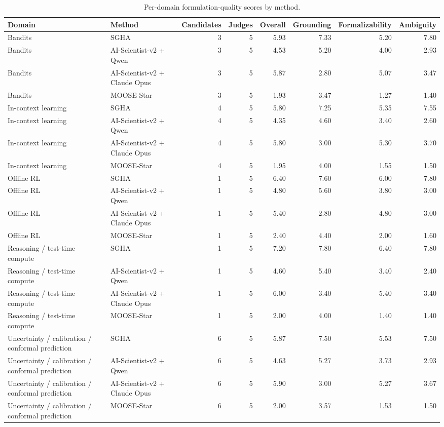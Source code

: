 \begin{table}[htbp]
\centering
\caption{Per-domain formulation-quality scores by method.}
\label{tab:per\_domain\_scores}
\begin{tabular}{llrrrrrr}
\toprule
Domain & Method & Candidates & Judges & Overall & Grounding & Formalizability & Ambiguity \\
\midrule
Bandits & SGHA & 3 & 5 & 5.93 & 7.33 & 5.20 & 7.80 \\
Bandits & AI-Scientist-v2 + Qwen & 3 & 5 & 4.53 & 5.20 & 4.00 & 2.93 \\
Bandits & AI-Scientist-v2 + Claude Opus & 3 & 5 & 5.87 & 2.80 & 5.07 & 3.47 \\
Bandits & MOOSE-Star & 3 & 5 & 1.93 & 3.47 & 1.27 & 1.40 \\
In-context learning & SGHA & 4 & 5 & 5.80 & 7.25 & 5.35 & 7.55 \\
In-context learning & AI-Scientist-v2 + Qwen & 4 & 5 & 4.35 & 4.60 & 3.40 & 2.60 \\
In-context learning & AI-Scientist-v2 + Claude Opus & 4 & 5 & 5.80 & 3.00 & 5.30 & 3.70 \\
In-context learning & MOOSE-Star & 4 & 5 & 1.95 & 4.00 & 1.55 & 1.50 \\
Offline RL & SGHA & 1 & 5 & 6.40 & 7.60 & 6.00 & 7.80 \\
Offline RL & AI-Scientist-v2 + Qwen & 1 & 5 & 4.80 & 5.60 & 3.80 & 3.00 \\
Offline RL & AI-Scientist-v2 + Claude Opus & 1 & 5 & 5.40 & 2.80 & 4.80 & 3.00 \\
Offline RL & MOOSE-Star & 1 & 5 & 2.40 & 4.40 & 2.00 & 1.60 \\
Reasoning / test-time compute & SGHA & 1 & 5 & 7.20 & 7.80 & 6.40 & 7.80 \\
Reasoning / test-time compute & AI-Scientist-v2 + Qwen & 1 & 5 & 4.60 & 5.40 & 3.40 & 2.40 \\
Reasoning / test-time compute & AI-Scientist-v2 + Claude Opus & 1 & 5 & 6.00 & 3.40 & 5.40 & 3.40 \\
Reasoning / test-time compute & MOOSE-Star & 1 & 5 & 2.00 & 4.00 & 1.40 & 1.40 \\
Uncertainty / calibration / conformal prediction & SGHA & 6 & 5 & 5.87 & 7.50 & 5.53 & 7.50 \\
Uncertainty / calibration / conformal prediction & AI-Scientist-v2 + Qwen & 6 & 5 & 4.63 & 5.27 & 3.73 & 2.93 \\
Uncertainty / calibration / conformal prediction & AI-Scientist-v2 + Claude Opus & 6 & 5 & 5.90 & 3.00 & 5.27 & 3.67 \\
Uncertainty / calibration / conformal prediction & MOOSE-Star & 6 & 5 & 2.00 & 3.57 & 1.53 & 1.50 \\
\bottomrule
\end{tabular}
\end{table}

